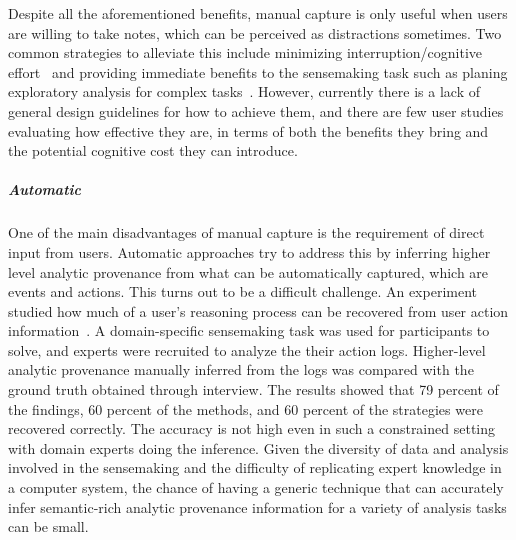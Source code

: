 Despite all the aforementioned benefits, manual capture is only useful when users are willing to take notes, which can be perceived as distractions sometimes. Two common strategies to alleviate this include minimizing interruption/cognitive effort~\cite{Hong2008} and providing immediate benefits to the sensemaking task such as planing exploratory analysis for complex tasks~\cite{Lunzer2014}. However, currently there is a lack of general design guidelines for how to achieve them, and there are few user studies evaluating how effective they are, in terms of both the benefits they bring and the potential cognitive cost they can introduce. 

\subparagraph{Automatic}
One of the main disadvantages of manual capture is the requirement of direct input from users. Automatic approaches try to address this by inferring higher level analytic provenance from what can be automatically captured, which are events and actions. This turns out to be a difficult challenge. An experiment studied how much of a user's reasoning process can be recovered from user action information~\cite{Dou2009}. A domain-specific sensemaking task was used for participants to solve, and experts were recruited to analyze the their action logs. Higher-level analytic provenance manually inferred from the logs was compared with the ground truth obtained through interview. The results showed that 79 percent of the findings, 60 percent of the methods, and 60 percent of the strategies were recovered correctly. The accuracy is not high even in such a constrained setting with domain experts doing the inference. Given the diversity of data and analysis involved in the sensemaking and the difficulty of replicating expert knowledge in a computer system, the chance of having a generic technique that can accurately infer semantic-rich analytic provenance information for a variety of analysis tasks can be small.


